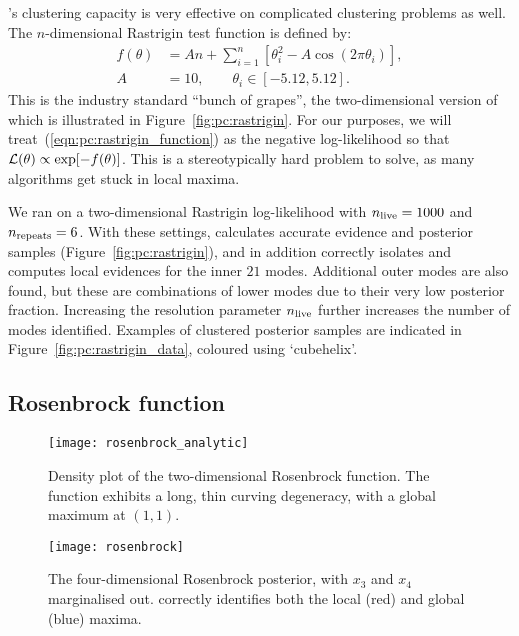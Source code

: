 \PolyChord{}'s clustering capacity is very effective on complicated clustering problems as well. The $n$-dimensional Rastrigin test function is defined by:
\begin{align}
  f(\theta) &= A n + \sum\limits_{i=1}^n \left[\theta_i^2 - A\cos(2 \pi \theta_i) \right],
  \label{eqn:pc:rastrigin_function}
  \\
  A&=10, \qquad \theta_i \in [-5.12,5.12]. \nonumber
\end{align}
This is the industry standard ``bunch of grapes'', the two-dimensional version of which is illustrated in Figure~\ref{fig:pc:rastrigin}.
For our purposes, we will treat~(\ref{eqn:pc:rastrigin_function}) as the negative log-likelihood so that $\mathcal{L}(\theta) \propto \exp[-f(\theta)]$.
This is a stereotypically hard problem to solve, as many algorithms get stuck in local maxima.



We ran \PolyChord{} on a two-dimensional Rastrigin log-likelihood  with $n_{\mathrm{live}}=1000$ and $n_{\mathrm{repeats}}=6$. With these settings, \PolyChord{} calculates accurate evidence and posterior samples (Figure~\ref{fig:pc:rastrigin}), and in addition correctly isolates and computes local evidences for the inner $21$ modes. Additional outer modes are also found, but these are combinations of lower modes due to their very low posterior fraction. Increasing the resolution parameter $n_{\mathrm{live}}$ further increases the number of modes identified.  Examples of clustered posterior samples are indicated in Figure~\ref{fig:pc:rastrigin_data}, coloured using  `cubehelix'.


\subsection{Rosenbrock function}
\label{sec:pc:rosenbrock}

\begin{figure}
  \centering
  \texttt{[image: rosenbrock\_analytic]}
  \caption{Density plot of the two-dimensional Rosenbrock function. The function exhibits a long, thin curving degeneracy, with a global maximum at $(1,1)$. \label{fig:pc:rosenbrock_2d}}
\end{figure}

\begin{figure}
  \centering
  \texttt{[image: rosenbrock]}
  \caption{The four-dimensional Rosenbrock posterior, with $x_3$ and $x_4$ marginalised out. \PolyChord{} correctly identifies both the local (red) and global (blue) maxima.\label{fig:pc:rosenbrock}}
\end{figure}

